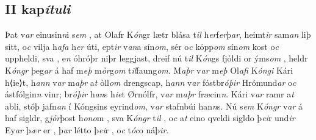 \beginnumbering \pstart  
\vspace{5mm}\subsection*{II kap\textit{ítuli}} 
Þat v\textit{ar} einusin\textit{n}i s\textit{em} , at Olafr K\textit{ón}gr lætr blása t\textit{il} h\textit{er}f\textit{er}þ\textit{ar}, 
heimt\textit{ir}  sam\textit{an} liþ sitt,
o\textit{c}  vilja h\textit{afa} h\textit{er} úti,  
ept\textit{ir} v\textit{an}a sín\textit{om},    sér o\textit{c} kỏpp\textit{om} sín\textit{om} kost o\textit{c} uppheldi, 
sva  , 
e\textit{n} óhróþr niþr leggjast, dreif nú t\textit{il} K\textit{ón}gs fjỏldi   or ýms\textit{om} ,  heldr   K\textit{óngr} þeg\textit{ar} á haf m\textit{eþ} m\textit{ỏr}g\textit{om}  t\textit{il}faung\textit{om}. 
M\textit{aþr} v\textit{ar}  m\textit{eþ} Ol\textit{afi} K\textit{óngi}  Kári h⟨ie⟩t, 
h\textit{ann} v\textit{ar}  m\textit{aþr} a\textit{t} ỏll\textit{om} drengscap,
h\textit{ann} v\textit{ar} fóstbr\textit{óþir} Hrómund\textit{ar} o\textit{c}  ástfólgin\textit{n} vinr;
br\textit{óþir} h\textit{an}s  h\textit{ie}t Ørnólfr,   v\textit{ar} m\textit{aþr} fræcin\textit{n}. 
Kári v\textit{ar} ramr  a\textit{t} abli,  stóþ jafn\textit{an} í Kóngsins eyrind\textit{om},   v\textit{ar} stafnbúi han\textit{n}s.  Nú s\textit{em} K\textit{óngr} v\textit{ar} á haf  sigldr, 
g\textit{jỏr}þost h\textit{ono}m  ,  
sva K\textit{óngr}  t\textit{il} , o\textit{c} a\textit{t} eino qveldi sigldo þ\textit{ei}r und\textit{ir} Ey\textit{ar} þ\textit{ær} er  , þ\textit{ar} létto  þ\textit{ei}r  , o\textit{c} t\textit{óc}o  náþ\textit{ir}. 

